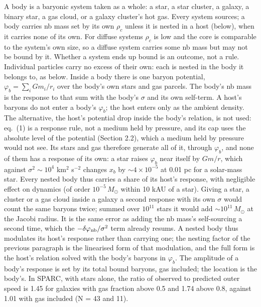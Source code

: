 \documentclass[
  10pt,
]{article}
\begin{document}
A body is a baryonic system taken as a whole: a star, a star cluster, a galaxy, a binary star, a gas cloud, or a galaxy cluster's hot gas. Every system sources; a body carries nb mass set by its own $\rho_c$ unless it is nested in a host (below), when it carries none of its own. For diffuse systems $\rho_c$ is low and the core is comparable to the system's own size, so a diffuse system carries some nb mass but may not be bound by it. Whether a system ends up bound is an outcome, not a rule. Individual particles carry no excess of their own: each is nested in the body it belongs to, as below. Inside a body there is one baryon potential, $\varphi_b=\sum_i Gm_i/r_i$ over the body's own stars and gas parcels. The body's nb mass is the response to that sum with the body's $\sigma$ and its own self-term. A host's baryons do not enter a body's $\varphi_b$; the host enters only as the ambient density. The alternative, the host's potential drop inside the body's relation, is not used: eq.~(1) is a response rule, not a medium held by pressure, and its cap uses the absolute level of the potential (Section 2.2), which a medium held by pressure would not see. Its stars and gas therefore generate all of it, through $\varphi_b$, and none of them has a response of its own: a star raises $\varphi_b$ near itself by $Gm/r$, which against $\sigma^2\sim10^4$ km$^2$ s$^{-2}$ changes $x_b$ by $\sim4\times10^{-5}$ at 0.01 pc for a solar-mass star. Every nested body thus carries a share of its host's response, with negligible effect on dynamics (of order $10^{-5}\,M_\odot$ within 10 kAU of a star). Giving a star, a cluster or a gas cloud inside a galaxy a second response with its own $\sigma$ would count the same baryons twice; summed over $10^{11}$ stars it would add $\sim10^{11}\,M_\odot$ at the Jacobi radius. It is the same error as adding the nb mass's self-sourcing a second time, which the $-\delta\varphi_{\rm nb}/\sigma^2$ term already resums. A nested body thus modulates its host's response rather than carrying one; the nesting factor of the previous paragraph is the linearised form of that modulation, and the full form is the host's relation solved with the body's baryons in $\varphi_b$. The amplitude of a body's response is set by its total bound baryons, gas included; the location is the body's. In SPARC, with stars alone, the ratio of observed to predicted outer speed is 1.45 for galaxies with gas fraction above 0.5 and 1.74 above 0.8, against 1.01 with gas included (N = 43 and 11).
\end{document}
